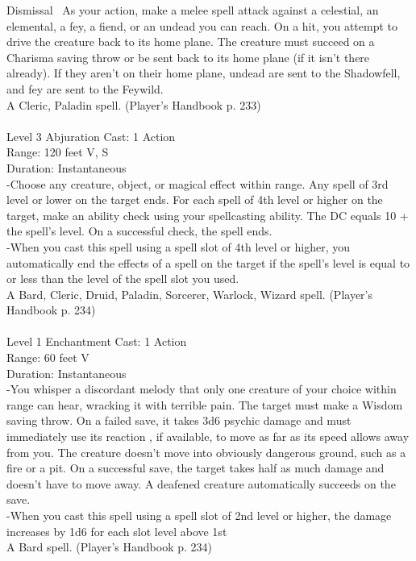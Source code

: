\documentclass[10pt,twocolumn]{report}
\begin{document}
Dismissal 
As your action, make a melee spell attack against a celestial, an elemental, a fey, a fiend, or an undead you can reach. On a hit, you attempt to drive the creature back to its home plane. The creature must succeed on a Charisma saving throw or be sent back to its home plane (if it isn’t there already). If they aren’t on their home plane, undead are sent to the Shadowfell, and fey are sent to the Feywild.\\
A Cleric, Paladin spell. (Player's Handbook p. 233) \\


 \\
Level 3 \quad Abjuration \quad Cast: 1 Action\\
Range: 120 feet \quad V, S\\
Duration: Instantaneous \quad \\
-Choose any creature, object, or magical effect within range. Any spell of 3rd level or lower on the target ends. For each spell of 4th level or higher on the target, make an ability check using your spellcasting ability. The DC equals 10 + the spell’s level. On a successful check, the spell ends.\\
-When you cast this spell using a spell slot of 4th level or higher, you automatically end the effects of a spell on the target if the spell’s level is equal to or less than the level of the spell slot you used.\\
A Bard, Cleric, Druid, Paladin, Sorcerer, Warlock, Wizard spell. (Player's Handbook p. 234) \\


 \\
Level 1 \quad Enchantment \quad Cast: 1 Action\\
Range: 60 feet \quad V\\
Duration: Instantaneous \quad \\
-You whisper a discordant melody that only one creature of your choice within range can hear, wracking it with terrible pain. 
The target must make a Wisdom saving throw. On a failed save, it takes 3d6 psychic damage and must immediately use its reaction , if available, to move as far as its speed allows away from you. The creature doesn’t move into obviously dangerous ground, such as a fire or a pit. On a successful save, the target takes half as much damage and doesn’t have to move away. A deafened creature automatically succeeds on the save.\\
-When you cast this spell using a spell slot of 2nd level or higher, the damage increases by 1d6 for each slot level above 1st\\
A Bard spell. (Player's Handbook p. 234) \\
\end{document}
